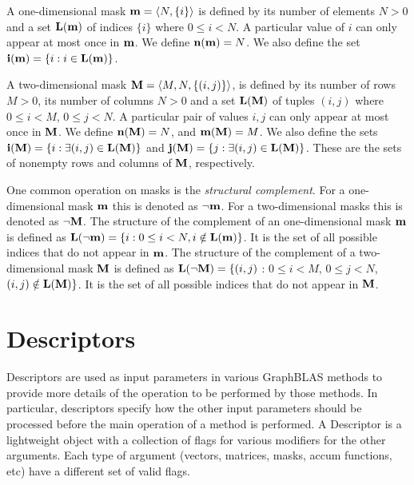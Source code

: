 A one-dimensional mask ${\bf m} = \langle N, \{ i \} \rangle$
is defined by its number of elements $N>0$ and a set $\bold{L}({\bf m})$ of indices $\{ i \}$ 
where $0 \leq i < N$.  A particular value of $i$ can only
appear at most once in ${\bf m}$. We define $\bold{n}({\bf m}) = N$. 
We also define the set
${\bf i({\bf m})} = \{ i : i \in \bold{L}({\bf m}) \}$.

A two-dimensional mask ${\bf M} = \langle M, N, \{ (i,j) \} \rangle$,
is defined by its number of rows $M>0$, its number of columns
$N>0$ and a set $\bold{L}({\bf M})$ of tuples $(i,j)$ where $0 \leq i < M$, $0 \leq
j < N$.   A particular pair of values $i,j$ can only
appear at most once in ${\bf M}$.  We define $\bold{n}({\bf M})
= N$, and $\bold{m}({\bf M}) = M$.  
We also define the sets ${\bf i({\bf M})} = \{
i : \exists (i,j) \in \bold{L}({\bf M}) \}$ and ${\bf j({\bf M})}
= \{ j : \exists (i,j) \in \bold{L}({\bf M}) \}$.  These are the sets
of nonempty rows and columns of ${\bf M}$, respectively.

One common operation on masks is the \emph{structural complement}.  For a one-dimensional mask ${\bf m}$ this
is denoted as $\neg{\bf m}$. For a two-dimensional
masks this is denoted as $\neg{\bf M}$.
The structure of the complement of an one-dimensional mask ${\bf m}$ is
defined as $\bold{L}(\neg{\bf m}) = \{i : 0 \leq i < N, i \notin \bold{L}({\bf m}) \}$.
It is the set of all possible indices that do not appear in ${\bf m}$.
The structure of the complement of a two-dimensional mask ${\bf M}$ is
defined as $\bold{L}(\neg{\bf M}) = \{(i,j)$ : $0 \leq i < M$, $0 \leq
j < N$, $(i,j) \notin \bold{L}({\bf M}) \}$.  It is the set of all possible
indices that do not appear in ${\bf M}$.

\section{Descriptors}

Descriptors are used as input parameters in various GraphBLAS methods to
provide more details of the operation to be performed by those methods.
In particular, descriptors specify how the other input parameters
should be processed before the main operation of a method is performed.
A Descriptor is a lightweight object with a collection of flags
for various modifiers for the other arguments.  Each type of argument
(vectors, matrices, masks, accum functions, etc) have a different set of
valid flags.

